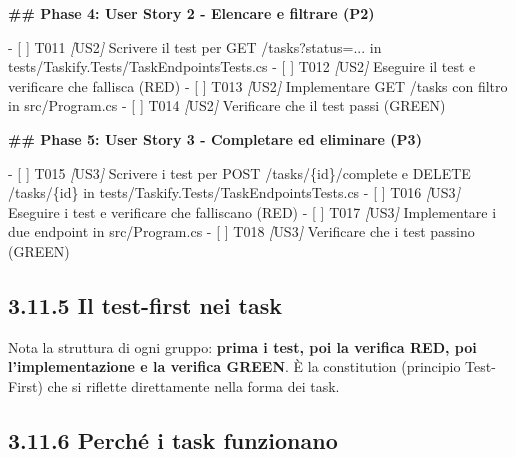 \documentclass[
  italian,
  10pt,
]{book}
\newenvironment{Shaded}{\begin{snugshade}}{\end{snugshade}}
\newcommand{\CommentTok}[1]{\textcolor[rgb]{0.56,0.35,0.01}{\textit{#1}}}
\newcommand{\FunctionTok}[1]{\textcolor[rgb]{0.13,0.29,0.53}{\textbf{#1}}}
\newcommand{\NormalTok}[1]{#1}
\newcommand{\OtherTok}[1]{\textcolor[rgb]{0.56,0.35,0.01}{#1}}
\newcommand{\SpecialStringTok}[1]{\textcolor[rgb]{0.31,0.60,0.02}{#1}}
\newcommand{\VariableTok}[1]{\textcolor[rgb]{0.00,0.00,0.00}{#1}}
\begin{document}
\begin{Shaded}
\begin{Highlighting}[]
\FunctionTok{\#\# Phase 4: User Story 2 {-} Elencare e filtrare (P2)}

\SpecialStringTok{{-} }\VariableTok{[ ]}\NormalTok{ T011 }\CommentTok{[}\OtherTok{US2}\CommentTok{]}\NormalTok{ Scrivere il test per GET /tasks?status=... in tests/Taskify.Tests/TaskEndpointsTests.cs}
\SpecialStringTok{{-} }\VariableTok{[ ]}\NormalTok{ T012 }\CommentTok{[}\OtherTok{US2}\CommentTok{]}\NormalTok{ Eseguire il test e verificare che fallisca (RED)}
\SpecialStringTok{{-} }\VariableTok{[ ]}\NormalTok{ T013 }\CommentTok{[}\OtherTok{US2}\CommentTok{]}\NormalTok{ Implementare GET /tasks con filtro in src/Program.cs}
\SpecialStringTok{{-} }\VariableTok{[ ]}\NormalTok{ T014 }\CommentTok{[}\OtherTok{US2}\CommentTok{]}\NormalTok{ Verificare che il test passi (GREEN)}

\FunctionTok{\#\# Phase 5: User Story 3 {-} Completare ed eliminare (P3)}

\SpecialStringTok{{-} }\VariableTok{[ ]}\NormalTok{ T015 }\CommentTok{[}\OtherTok{US3}\CommentTok{]}\NormalTok{ Scrivere i test per POST /tasks/\{id\}/complete e DELETE /tasks/\{id\} in tests/Taskify.Tests/TaskEndpointsTests.cs}
\SpecialStringTok{{-} }\VariableTok{[ ]}\NormalTok{ T016 }\CommentTok{[}\OtherTok{US3}\CommentTok{]}\NormalTok{ Eseguire i test e verificare che falliscano (RED)}
\SpecialStringTok{{-} }\VariableTok{[ ]}\NormalTok{ T017 }\CommentTok{[}\OtherTok{US3}\CommentTok{]}\NormalTok{ Implementare i due endpoint in src/Program.cs}
\SpecialStringTok{{-} }\VariableTok{[ ]}\NormalTok{ T018 }\CommentTok{[}\OtherTok{US3}\CommentTok{]}\NormalTok{ Verificare che i test passino (GREEN)}
\end{Highlighting}
\end{Shaded}

\subsection{3.11.5 Il test-first nei task}\label{il-test-first-nei-task}

Nota la struttura di ogni gruppo: \textbf{prima i test, poi la verifica
RED, poi l'implementazione e la verifica GREEN}. È la constitution
(principio Test-First) che si riflette direttamente nella forma dei
task.

\subsection{3.11.6 Perché i task
funzionano}\label{perchuxe9-i-task-funzionano}
\end{document}
